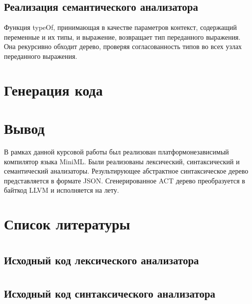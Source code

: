 \documentclass[a4paper,12pt]{article}
\numberwithin{equation}{section}
\begin{document}
\subsection{Реализация семантического анализатора}
Функция typeOf, принимающая в качестве параметров контекст,
содержащий переменные и их типы, и выражение, возвращает тип
переданного выражения. Она рекурсивно обходит дерево, проверяя
согласованность типов во всех узлах переданного выражения.

\section{Генерация кода}


\section{Вывод}
В рамках данной курсовой работы был реализован платформонезависимый компилятор
языка MiniML. Были реализованы лексический, синтаксический и
семантический анализаторы. Результирующее абстрактное синтаксическое
дерево представляется в формате JSON. Сгенерированное ACT дерево преобразуется
в байткод LLVM и исполняется на лету.

\section{Список литературы}
\printbibliography[heading=none]

\section*{}
\subsection*{Исходный код лексического анализатора}

\clearpage

\section*{}
\subsection*{Исходный код синтаксического анализатора}

\clearpage
\end{document}
